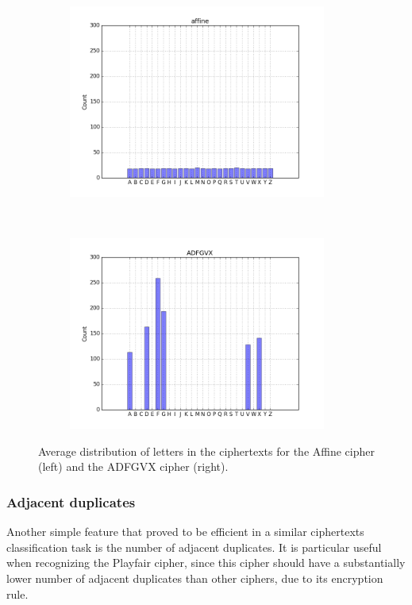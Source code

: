 \documentclass[a4paper]{article}
\begin{document}
\begin{figure}[H]
    \centering
    \begin{subfigure}[h]{0.5\textwidth}
    		\centering
        \includegraphics[height=2.5in]{img/affine_dist.png}
    \end{subfigure}%
    ~
    \begin{subfigure}[h]{0.5\textwidth}
	    \centering
        \includegraphics[height=2.5in]{img/adfgvx_dist.png}
    \end{subfigure}
    \caption{Average distribution of letters in the ciphertexts for the Affine cipher (left) and the ADFGVX cipher (right).}
    \label{fig:letter_dist}
\end{figure}

\subsubsection*{Adjacent duplicates}
Another simple feature that proved to be efficient in a similar ciphertexts classification task \cite{sivagurunathan2010classification} is the number of adjacent duplicates. It is particular useful when recognizing the Playfair cipher, since this cipher should have a substantially lower number of adjacent duplicates than other ciphers, due to its encryption rule.
\end{document}
